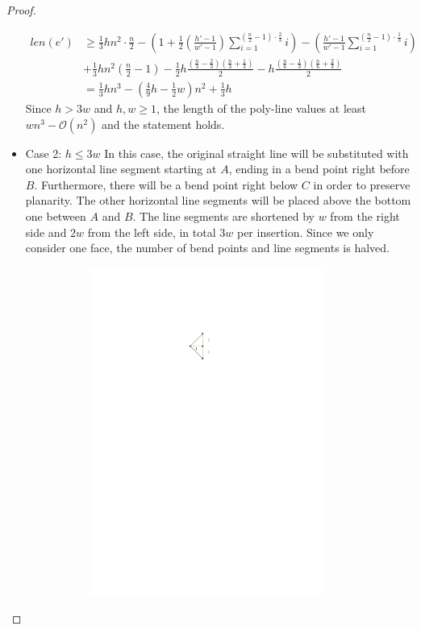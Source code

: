 \begin{proof}
\begin{itemize}
		\begin{align}
			len(e') &\geq \frac{1}{3}hn^2\cdot \frac{n}{2}-\left(1+\frac{1}{2}\left(\frac{h'-1}{w'-1}\right)\sum_{i=1}^{\left(\frac{n}{2}-1\right)\cdot\frac{2}{3}}i\right)-\left(\frac{h'-1}{w'-1}\sum_{i=1}^{\left(\frac{n}{2}-1\right)\cdot\frac{1}{3}}i\right)\label{eq:vertical}\\
			&+ \frac{1}{3}hn^2\left(\frac{n}{2}-1\right)-\frac{1}{2}h\frac{\left(\frac{n}{3}-\frac{2}{3}\right)\left(\frac{n}{3}+\frac{1}{3} \right)}{2}-h\frac{\left(\frac{n}{6}-\frac{1}{3}\right)\left(\frac{n}{6}+\frac{2}{3}\right)}{2}\label{eq:vertical-connectors}\\
			&=\frac{1}{3}hn^3-\left(\frac{4}{9}h-\frac{1}{2}w\right)n^2+\frac{1}{3}h
		\end{align}
	Since $h>3w$ and $h,w\geq1$, the length of the poly-line values at least $wn^3-\mathcal{O}(n^2)$ and the statement holds.
		\item Case 2: $h \leq 3w$
	In this case, the original straight line will be substituted with one horizontal line segment starting at $A$, ending in a bend point right before $B$. Furthermore, there will be a bend point right below $C$ in order to preserve planarity. The other horizontal line segments will be placed above the bottom one between $A$ and $B$. The line segments are shortened by $w$ from the right side and $2w$ from the left side, in total $3w$ per insertion. Since we only consider one face, the number of bend points and line segments is halved. 
	\begin{figure}[H]
		\centering
		\begin{subfigure}{0.6\linewidth}
			\centering
			\includegraphics[width=0.9\textwidth,page=9]{drawings/maximal_planar.pdf}

\end{subfigure}
\end{figure}
\end{itemize}
\end{proof}
